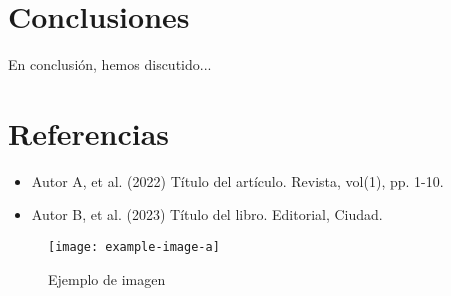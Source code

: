\documentclass{article}
\begin{document}
\section{Conclusiones}
En conclusión, hemos discutido...

\section{Referencias}
\begin{itemize}
  \item Autor A, et al. (2022) Título del artículo. Revista, vol(1), pp. 1-10.
  \item Autor B, et al. (2023) Título del libro. Editorial, Ciudad.
\end{itemize}

\begin{figure}[h]
  \centering
  \texttt{[image: example-image-a]}
  \caption{Ejemplo de imagen}
  \label{fig:ejemplo}
\end{figure}
\end{document}

